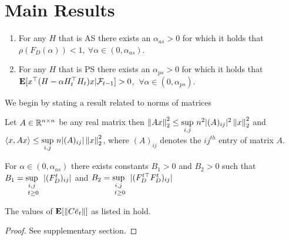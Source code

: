 \section{Main Results}
\begin{lemma}\label{addstep}
\begin{enumerate}[label=(\roman*)]
\item\label{ascase} For any $H$ that is AS there exists an $\alpha_{as}>0$ for which it holds that $\rho(F_D(\alpha))<1,~\forall \alpha\in (0,\alpha_{as})$.
\item\label{pscase} For any $H$ that is PS there exists an $\alpha_{ps}>0$ for which it holds that $\E[x^\top(H-\alpha H_t^\top H_t)x|\F_{t-1}]> 0$, $~\forall \alpha\in (0,\alpha_{ps})$.
\end{enumerate}
\end{lemma}
We begin by stating a result related to norms of matrices
\begin{lemma}
Let $A\in \R^{n\times n}$ be any real matrix then $\norm{Ax}^2_2\leq \us{\sup}{i,j}n^2|(A)_{ij}|^2\norm{x}^2_2$ and $\ip{x,Ax}\leq \us{\sup}{i,j}n|(A)_{ij}|\norm{x}^2_2$, where $(A)_{ij}$ denotes the $ij^{th}$ entry of matrix $A$.
\end{lemma}
\begin{lemma}
For $\alpha \in (0,\alpha_{as})$ there exists constants $B_1>0$ and $B_2>0$ such that $B_1=\us{\us{\sup}{i,j}}{t\geq 0}|(F_D^t)_{ij}|$ and $B_2=\us{\us{\sup}{i,j}}{t\geq 0}|(F_D^{t\top}F_D^t)_{ij}|$
\end{lemma}
\begin{theorem}\label{maintheorem}
The values of $\E[\norm{C\eb_t}]$ as listed in  hold.
\end{theorem}
\begin{proof}
See supplementary section.
\end{proof}
